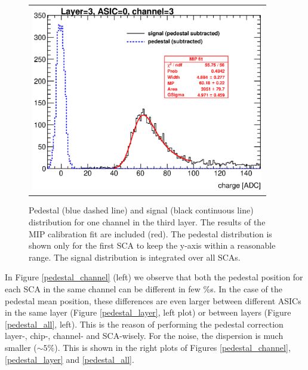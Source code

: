 \documentclass[a4paper,11pt]{article}
\begin{document}
\begin{figure}[!t]
  \centering
  \begin{tabular}{l}
    \includegraphics[width=4in]{figs/mip_pedestal_example.eps}
  \end{tabular}
  \caption{Pedestal (blue dashed line) and signal (black continuous line) distribution for one channel in the third layer. The results of the MIP calibration fit are included (red). The pedestal distribution is shown only for the first SCA to keep the y-axis within a reasonable range. The signal distribution is integrated over all SCAs.}
\label{signal_pedestal}
\end{figure}


In Figure \ref{pedestal_channel} (left) we observe that both the pedestal position for each SCA in the same channel can be
different in few \%s. In the case of the pedestal mean position, these differences are even larger between different ASICs in the same
layer (Figure \ref{pedestal_layer}, left plot) or between layers (Figure \ref{pedestal_all}, left). This is the reason of
performing the pedestal correction layer-, chip-, channel- and SCA-wisely.
For the noise, the dispersion is much smaller ($\sim 5 \%$). This is shown in the right plots of Figures \ref{pedestal_channel}, \ref{pedestal_layer} and \ref{pedestal_all}.
\end{document}
